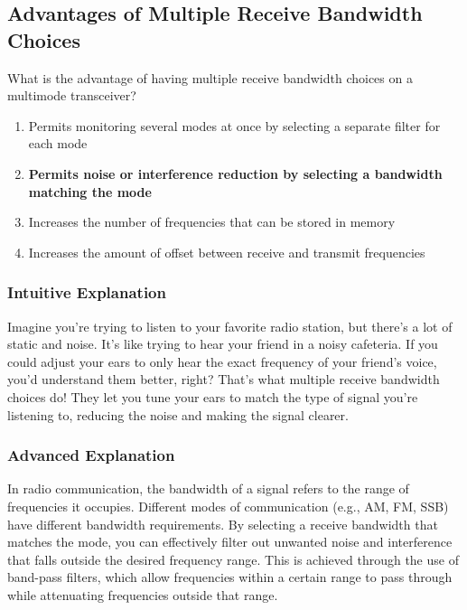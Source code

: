 \subsection{Advantages of Multiple Receive Bandwidth Choices}
\label{T4B08}

\begin{tcolorbox}[colback=gray!10!white,colframe=black!75!black,title=T4B08]
What is the advantage of having multiple receive bandwidth choices on a multimode transceiver?
\begin{enumerate}[label=\Alph*]
    \item Permits monitoring several modes at once by selecting a separate filter for each mode
    \item \textbf{Permits noise or interference reduction by selecting a bandwidth matching the mode}
    \item Increases the number of frequencies that can be stored in memory
    \item Increases the amount of offset between receive and transmit frequencies
\end{enumerate}
\end{tcolorbox}

\subsubsection{Intuitive Explanation}
Imagine you're trying to listen to your favorite radio station, but there's a lot of static and noise. It's like trying to hear your friend in a noisy cafeteria. If you could adjust your ears to only hear the exact frequency of your friend's voice, you'd understand them better, right? That's what multiple receive bandwidth choices do! They let you tune your ears to match the type of signal you're listening to, reducing the noise and making the signal clearer.

\subsubsection{Advanced Explanation}
In radio communication, the bandwidth of a signal refers to the range of frequencies it occupies. Different modes of communication (e.g., AM, FM, SSB) have different bandwidth requirements. By selecting a receive bandwidth that matches the mode, you can effectively filter out unwanted noise and interference that falls outside the desired frequency range. This is achieved through the use of band-pass filters, which allow frequencies within a certain range to pass through while attenuating frequencies outside that range.

